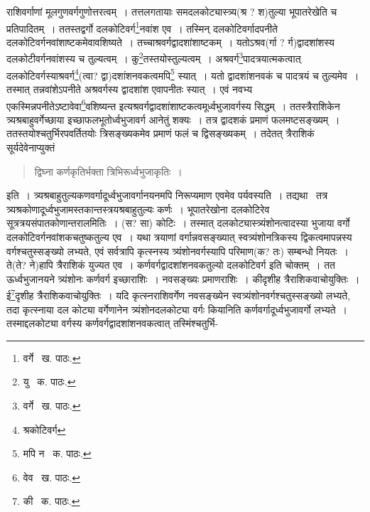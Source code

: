 \documentclass[11pt, openany]{book}
\begin{document}
\noindent राशिवर्गाणां मूलगुणवर्गगुणोत्तरत्वम्~। तत्तलगतायाः समदलकोट्यास्त्र्य(श्र ? श)तुल्या भूपातरेखेति च प्रतिपादितम्~। ततस्तद्वर्गो दलकोटिवर्ग\renewcommand{\thefootnote}{१}\footnote{वर्गे \textendash\ ख. पाठः.}नवांश एव~। तस्मिन् दलकोटिवर्गादपनीते दलकोटिवर्गनवांशाष्टकमेवावशिष्यते~। तच्चाश्रवर्गद्वादशांशाष्टकम्~। यतोऽश्रव(र्गा ? र्ग)द्वादशांशस्य दलकोटीवर्गनवांशस्य च तुल्यत्वम्~। कु\renewcommand{\thefootnote}{२}\footnote{यु \textendash\ क. पाठः.}तस्तयोस्तुल्यत्वम्~। अश्रवर्ग\renewcommand{\thefootnote}{३}\footnote{वर्गे \textendash\ ख. पाठः.}पादत्रयात्मकत्वात् दलकोटिवर्गस्याश्रवर्ग\renewcommand{\thefootnote}{४}\footnote{श्रकोटिवर्ग}(त्वा? द्वा)दशांशनवकत्वमपि\renewcommand{\thefootnote}{५}\footnote{मपि न \textendash\ क. पाठः.} स्यात्~। यतो द्वादशांशनवकं च पादत्रयं च तुल्यमेव~। तस्मात् तन्नवांशेऽपनीते अश्रवर्गस्य द्वादशांश एवापनीतः स्यात्~। एवं नवभ्य एकस्मिन्नपनीतेऽष्टावेवा\renewcommand{\thefootnote}{६}\footnote{वेव \textendash\ ख. पाठः.}वशिष्यन्त इत्यश्रवर्गद्वादशांशाष्टकत्वमूर्ध्वभुजावर्गस्य सिद्धम्~। ततस्त्रैराशिकेन त्र्यश्रबाहुवर्गेच्छाया इच्छाफलभूतोर्ध्वभुजावर्ग आनेतुं शक्यः~। तत्र द्वादशकं प्रमाणं फलमष्टसङ्ख्यम्~। ततस्तयोश्चतुर्भिरपवर्तितयोः त्रिसङ्ख्यकमेव प्रमाणं फलं च द्विसङ्ख्यकम्~। तदेतत् त्रैराशिकं सूर्यदेवेनाप्युक्तं\textendash 

\begin{quote}
{\qt द्विघ्ना कर्णकृतिर्भक्ता त्रिभिरूर्ध्वभुजाकृतिः~।}
\end{quote}

\noindent इति~। त्र्यश्रबाहुतुल्यकणवर्गादूर्ध्वभुजावर्गानयनमपि निरूप्यमाण एवमेव पर्यवस्यति~। तद्यथा \textendash\ तत्र
त्र्यश्रकोणादूर्ध्वभुजामस्तकान्तस्त्रयश्रबाहुतुल्यः कर्णः~। भूपातरेखोना दलकोटिरेव सूत्रत्रयसंपातकोणान्तरालमितिः~। (स? सा) कोटिः~। तस्मात् दलकोट्यास्त्र्यंशोनत्वादस्या भुजाया वर्गो दलकोटिवर्गनवांशकचतुष्कतुल्य एव~। यथा त्रयाणां वर्गान्नवसङ्ख्यात्
स्वत्र्यंशोनत्रिकस्य द्विकत्वमापन्नस्य वर्गश्चतुस्सङ्ख्यो लभ्यते, एवं सर्वत्रापि कृत्स्नस्य त्र्यंशोनवर्गस्यापि परिमाण(क? तः) सम्बन्धो नियतः~। ते(ते? ने)हापि त्रैराशिकं युज्यत एव~। कर्णवर्गद्वादशांशनवकतुल्यो दलकोटिवर्ग इति चोक्तम्~। तत ऊर्ध्वभुजानयने त्र्यंशोनः कर्णवर्ग इच्छाराशिः~। नवसङ्ख्यः प्रमाणराशिः~। कीदृशीह त्रैराशिकवाचोयुक्तिः~। ई\renewcommand{\thefootnote}{७}\footnote{की \textendash\ क. पाठः.}दृशीह त्रैराशिकवाचोयुक्तिः~। यदि कृत्स्नराशिवर्गेण नवसङ्ख्येन स्वत्र्यंशोनवर्गश्चतुस्सङ्ख्यो लभ्यते, तदा कृत्स्नाया दल कोट्या वर्गेणानेन त्र्यंशोनदलकोट्या वर्गः कियानिति कर्णवर्गादूर्ध्वभुजावर्गो लभ्यते~। तस्माद्दलकोट्या वर्गस्य कर्णवर्गद्वादशांशनवकत्वात् तस्मिंश्चतुर्भि-

\newpage
\end{document}
